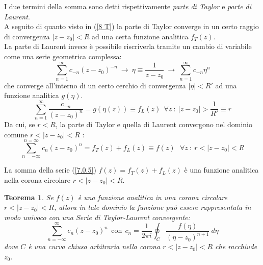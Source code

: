 \documentclass[twoside]{article}
\newtheorem{theorem}{Teorema}[section]
\begin{document}
I due termini della somma sono detti rispettivamente \textit{parte di Taylor} e \textit{parte di Laurent}.
\\
A seguito di quanto visto in (\ref{8 T}) la parte di Taylor converge in un certo raggio di convergenza $|z-z_0|<R$ ad una certa funzione analitica $f_T(z)$.
\\
La parte di Laurent invece è possibile riscriverla tramite un cambio di variabile come una serie geometrica complessa:
\begin{equation}
    \sum_{n=1}^{\infty}c_{-n}(z-z_0)^{-n} \ \to \ \eta \equiv \frac{1}{z-z_0} \ \to \ \sum_{n=1}^{\infty}c_{-n}\eta^n
\end{equation}
che converge all'interno di un certo cerchio di convergenza $|\eta|<R'$ ad una funzione analitica $g(\eta)$.
\begin{equation}
    \sum_{n=1}^{\infty}\frac{c_{-n}}{(z-z_0)^n}=g(\eta(z))\equiv f_L(z) \ \ \forall z \ : \ |z-z_0|>\frac{1}{R'}\equiv r
\end{equation}
Da cui, se $r<R$, la parte di Taylor e quella di Laurent convergono nel dominio comune $r<|z-z_0|<R$ :
\begin{equation} \label{7.0.5}
    \sum_{n=-\infty}^{n=\infty}c_n(z-z_0)^n=f_T(z)+f_L(z) \equiv f(z) \ \ \ \forall z \ : \ r<|z-z_0|<R
\end{equation}

\begin{center}
\end{center}
La somma della serie (\ref{7.0.5}) $f(z)=f_T(z)+f_L(z)$ è una funzione analitica nella corona circolare $r<|z-z_0|<R$.

\begin{theorem} \label{7.1}
Se $f(z)$ è una funzione analitica in una corona circolare $r<|z-z_0|<R$, allora in tale dominio la funzione può essere rappresentata in modo univoco con una \textit{Serie di Taylor-Laurent} convergente:
\begin{equation}
    \sum_{n=-\infty}^{\infty} c_n(z-z_0)^n \ \ \text{con} \ \ c_n=\frac{1}{2\pi i}\oint_C \frac{f(\eta)}{(\eta-z_0)^{n+1}} \ d\eta
\end{equation}
dove $C$ è una curva chiusa arbitraria nella corona $r<|z-z_0|<R$ che racchiude $z_0$.
\end{theorem}
\end{document}

